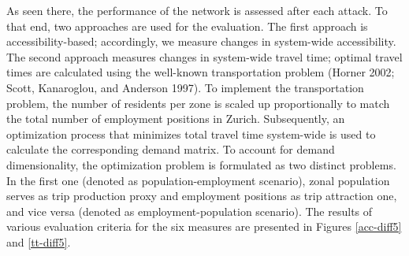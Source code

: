 \documentclass[]{elsarticle} %
\begin{document}
As seen there, the performance of the network is assessed after each
attack. To that end, two approaches are used for the evaluation. The
first approach is accessibility-based; accordingly, we measure changes
in system-wide accessibility. The second approach measures changes in
system-wide travel time; optimal travel times are calculated using the
well-known transportation problem (Horner 2002; Scott, Kanaroglou, and
Anderson 1997). To implement the transportation problem, the number of
residents per zone is scaled up proportionally to match the total number
of employment positions in Zurich. Subsequently, an optimization process
that minimizes total travel time system-wide is used to calculate the
corresponding demand matrix. To account for demand dimensionality, the
optimization problem is formulated as two distinct problems. In the
first one (denoted as population-employment scenario), zonal population
serves as trip production proxy and employment positions as trip
attraction one, and vice versa (denoted as employment-population
scenario). The results of various evaluation criteria for the six
measures are presented in Figures \ref{acc-diff5} and \ref{tt-diff5}.
\end{document}
